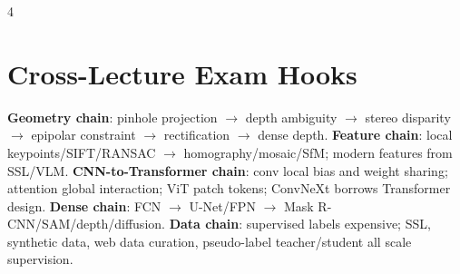 \documentclass[8pt,a4paper,landscape]{extarticle}
\newcommand{\key}[1]{\textbf{#1}}
\begin{document}
\begin{multicols*}{4}
\section{Cross-Lecture Exam Hooks}
\key{Geometry chain}: pinhole projection $\to$ depth ambiguity $\to$ stereo disparity $\to$ epipolar constraint $\to$ rectification $\to$ dense depth. \key{Feature chain}: local keypoints/SIFT/RANSAC $\to$ homography/mosaic/SfM; modern features from SSL/VLM. \key{CNN-to-Transformer chain}: conv local bias and weight sharing; attention global interaction; ViT patch tokens; ConvNeXt borrows Transformer design. \key{Dense chain}: FCN $\to$ U-Net/FPN $\to$ Mask R-CNN/SAM/depth/diffusion. \key{Data chain}: supervised labels expensive; SSL, synthetic data, web data curation, pseudo-label teacher/student all scale supervision.

\end{multicols*}
\end{document}
